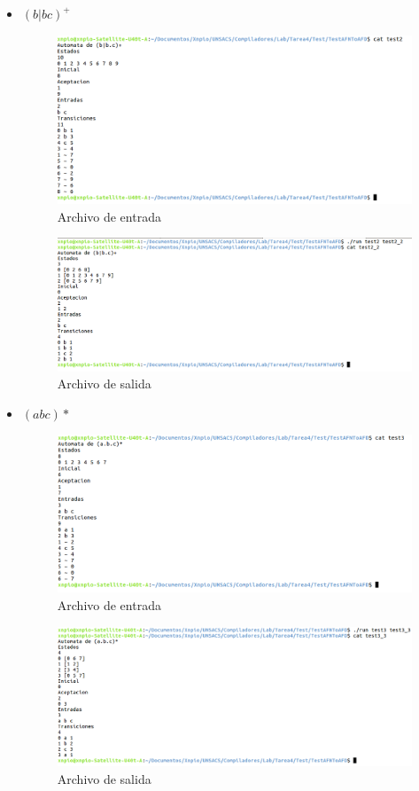 \documentclass[a4paper,12pt]{article}
\begin{document}
\begin{itemize}
 \item $(b|bc)^{+}$
 \begin{figure}[H]
  \centering
  \includegraphics[scale = 0.4]{3.png}
  \caption{Archivo de entrada}
 \end{figure}
 \begin{figure}[H]
  \centering
  \includegraphics[scale = 0.4]{4.png}
  \caption{Archivo de salida}
 \end{figure}
 
 \item $(abc)*$
 \begin{figure}[H]
  \centering
  \includegraphics[scale = 0.4]{5.png}
  \caption{Archivo de entrada}
 \end{figure}
 \begin{figure}[H]
  \centering
  \includegraphics[scale = 0.4]{6.png}
  \caption{Archivo de salida}
 \end{figure}
 
\end{itemize}


 
\end{document}
